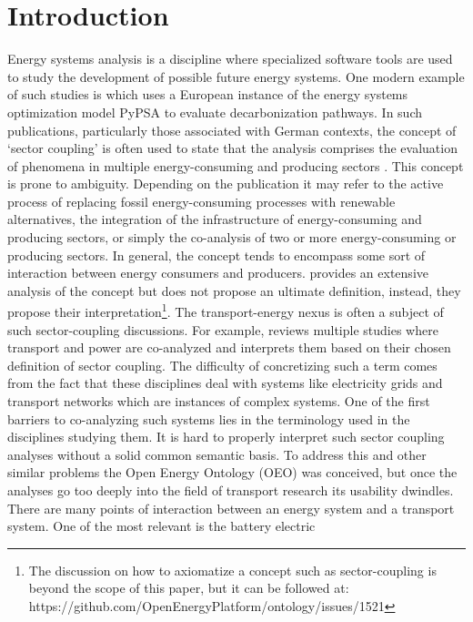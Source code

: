 ﻿\section{Introduction}
\label{introduction}
Energy systems analysis is a discipline where specialized software tools are
used to study the development of possible future energy systems. One modern
example of such studies is \cite{Victoria.2022} which uses a European instance
of the energy systems optimization model PyPSA \cite{Brown.2018} to evaluate
decarbonization pathways. In such publications, particularly those associated
with German contexts, the concept of `sector coupling' is often used to state
that the analysis comprises the evaluation of phenomena in multiple
energy-consuming and producing sectors \cite{Fridgen.2020}. This concept is
prone to ambiguity. Depending on the publication it may refer to the active
process of replacing fossil energy-consuming processes with renewable
alternatives, the integration of the infrastructure of energy-consuming and
producing sectors, or simply the co-analysis of two or more energy-consuming or
producing sectors. In general, the concept tends to encompass some sort of
interaction between energy consumers and producers. \cite{Ramsebner.2021}
provides an extensive analysis of the concept but does not propose an ultimate
definition, instead, they propose their interpretation\footnote{The discussion
on how to axiomatize a concept such as sector-coupling is beyond the scope of
this paper, but it can be followed at:
https://github.com/OpenEnergyPlatform/ontology/issues/1521}. The
transport-energy nexus is often a subject of such sector-coupling discussions.
For example, \cite{Robinius.2017} reviews multiple studies where transport and
power are co-analyzed and interprets them based on their chosen definition of
sector coupling. The difficulty of concretizing such a term comes from the fact
that these disciplines deal with systems like electricity grids and transport
networks which are instances of complex systems. One of the first barriers to
co-analyzing such systems lies in the terminology used in the disciplines
studying them. It is hard to properly interpret such sector coupling analyses
without a solid common semantic basis. To address this and other similar
problems the Open Energy Ontology (OEO) \cite{Booshehri.2021} was conceived, but
once the analyses go too deeply into the field of transport research its
usability dwindles. There are many points of interaction between an energy
system and a transport system. One of the most relevant is the battery electric
